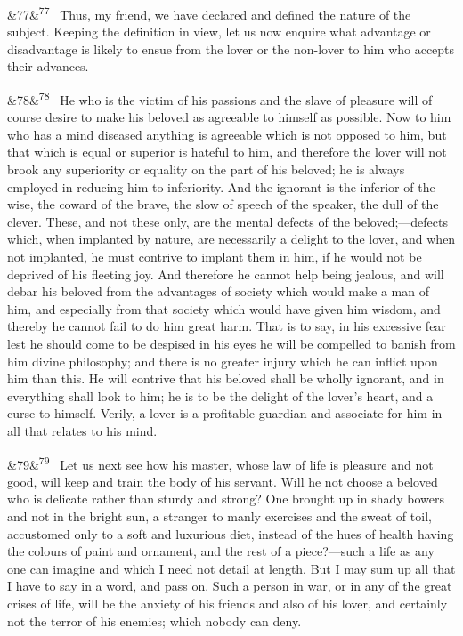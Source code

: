 \documentclass[12pt]{article}
\newcommand{\para}[1][]{\par\noindent\ifx&#1&\else\textsuperscript{\footnotesize #1}~\fi}
\begin{document}
\para[77] Thus, my friend, we have declared and defined the nature of the subject. Keeping the definition in view, let us now enquire what advantage or disadvantage is likely to ensue from the lover or the non-lover to him who accepts their advances.

\para[78] He who is the victim of his passions and the slave of pleasure will of course desire to make his beloved as agreeable to himself as possible. Now to him who has a mind diseased anything is agreeable which is not opposed to him, but that which is equal or superior is hateful to him, and therefore the lover will not brook any superiority or equality on the part of his beloved; he is always employed in reducing him to inferiority. And the ignorant is the inferior of the wise, the coward of the brave, the slow of speech of the speaker, the dull of the clever. These, and not these only, are the mental defects of the beloved;---defects which, when implanted by nature, are necessarily a delight to the lover, and when not implanted, he must contrive to implant them in him, if he would not be deprived of his fleeting joy. And therefore he cannot help being jealous, and will debar his beloved from the advantages of society which would make a man of him, and especially from that society which would have given him wisdom, and thereby he cannot fail to do him great harm. That is to say, in his excessive fear lest he should come to be despised in his eyes he will be compelled to banish from him divine philosophy; and there is no greater injury which he can inflict upon him than this. He will contrive that his beloved shall be wholly ignorant, and in everything shall look to him; he is to be the delight of the lover's heart, and a curse to himself. Verily, a lover is a profitable guardian and associate for him in all that relates to his mind.

\para[79] Let us next see how his master, whose law of life is pleasure and not good, will keep and train the body of his servant. Will he not choose a beloved who is delicate rather than sturdy and strong? One brought up in shady bowers and not in the bright sun, a stranger to manly exercises and the sweat of toil, accustomed only to a soft and luxurious diet, instead of the hues of health having the colours of paint and ornament, and the rest of a piece?---such a life as any one can imagine and which I need not detail at length. But I may sum up all that I have to say in a word, and pass on. Such a person in war, or in any of the great crises of life, will be the anxiety of his friends and also of his lover, and certainly not the terror of his enemies; which nobody can deny.
\end{document}
